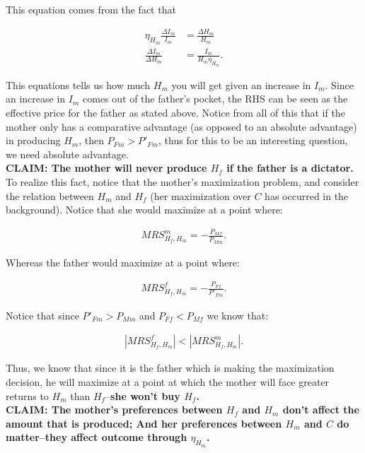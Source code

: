 \documentclass[12pt]{paper}
\begin{document}
This equation comes from the fact that

\begin{align*}
    \eta_{H_m} \frac{\Delta I_m}{I_m}&=\frac{\Delta H_m}{H_m}\\
    \frac{\Delta I_m}{\Delta H_m}&=\frac{I_m}{H_m \eta_{H_m}}.
\end{align*}

This equations tells us how much $H_m$ you will get given an increase
in $I_m$. Since an increase in $I_m$ comes out of the father's pocket,
the RHS can be seen as the effective price for the father as stated
above. Notice from all of this that if the mother only has a
comparative advantage (as opposed to an absolute advantage) in
producing $H_m$, then $P_{Fm}>P'_{Fm}$, thus for this to be an
interesting question, we need absolute advantage.
\\

\textbf{CLAIM: The mother will never produce $H_f$ if the father is a dictator.}
\\

To realize this fact, notice that the mother's maximization problem,
and consider the relation between $H_m$ and $H_f$ (her maximization
over $C$ has occurred in the background). Notice that she would
maximize at a point where:

\begin{align*}
    MRS^m_{H_f,H_m}=-\frac{P_{Mf}}{P_{Mm}}.
\end{align*}

Whereas the father would maximize at a point where:

\begin{align*}
    MRS^f_{H_f,H_m}=-\frac{P_{Ff}}{P'_{Fm}}.
\end{align*}

Notice that since $P'_{Fm}>P_{Mm}$ and $P_{Ff}<P_{Mf}$ we know that:

\begin{align*}
    |MRS^f_{H_f,H_m}|<|MRS^m_{H_f,H_m}|.
\end{align*}

Thus, we know that since it is the father which is making the
maximization decision, he will maximize at a point at which the mother
will face greater returns to $H_m$ than $H_f$--\textbf{she won't buy
  $H_f$.}
\\

\textbf{CLAIM: The mother's preferences between $H_f$ and $H_m$ don't
  affect the amount that is produced; And her preferences between
  $H_m$ and $C$ do matter--they affect outcome through $\eta_{H_m}$.}
\\
\end{document}
